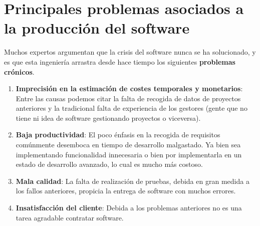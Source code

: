 \section{Principales problemas asociados a la producción del software}
Muchos expertos argumentan que la crisis del software nunca se ha solucionado, y es que esta ingeniería arrastra desde hace tiempo los siguientes \textbf{problemas crónicos}.
\begin{enumerate}
    \item \textbf{Imprecisión en la estimación de costes temporales y monetarios}: Entre las causas podemos citar la falta de recogida de datos de proyectos anteriores y la tradicional falta de experiencia de los gestores (gente que no tiene ni idea de software gestionando proyectos o viceversa).
    \item \textbf{Baja productividad}: El poco énfasis en la recogida de requisitos comúnmente desemboca en tiempo de desarrollo malgastado. Ya bien sea implementando funcionalidad innecesaria o bien por implementarla en un estado de desarrollo avanzado, lo cual es mucho más costoso.
    \item \textbf{Mala calidad}: La falta de realización de pruebas, debida en gran medida a los fallos anteriores, propicia la entrega de software con muchos errores.
    \item \textbf{Insatisfacción del cliente}: Debida a los problemas anteriores no es una tarea agradable contratar software.
\end{enumerate}